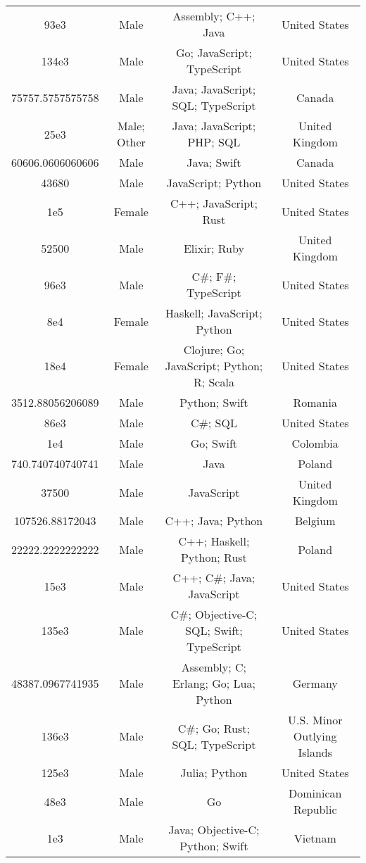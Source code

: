 \begin{center}
\begin{tabular}{ |c|c|c|c| }
93e3  &  Male  &  Assembly; C++; Java  &  United States  \\ 
134e3  &  Male  &  Go; JavaScript; TypeScript  &  United States  \\ 
75757.5757575758  &  Male  &  Java; JavaScript; SQL; TypeScript  &  Canada  \\ 
25e3  &  Male; Other  &  Java; JavaScript; PHP; SQL  &  United Kingdom  \\ 
60606.0606060606  &  Male  &  Java; Swift  &  Canada  \\ 
43680  &  Male  &  JavaScript; Python  &  United States  \\ 
1e5  &  Female  &  C++; JavaScript; Rust  &  United States  \\ 
52500  &  Male  &  Elixir; Ruby  &  United Kingdom  \\ 
96e3  &  Male  &  C\#; F\#; TypeScript  &  United States  \\ 
8e4  &  Female  &  Haskell; JavaScript; Python  &  United States  \\ 
18e4  &  Female  &  Clojure; Go; JavaScript; Python; R; Scala  &  United States  \\ 
3512.88056206089  &  Male  &  Python; Swift  &  Romania  \\ 
86e3  &  Male  &  C\#; SQL  &  United States  \\ 
1e4  &  Male  &  Go; Swift  &  Colombia  \\ 
740.740740740741  &  Male  &  Java  &  Poland  \\ 
37500  &  Male  &  JavaScript  &  United Kingdom  \\ 
107526.88172043  &  Male  &  C++; Java; Python  &  Belgium  \\ 
22222.2222222222  &  Male  &  C++; Haskell; Python; Rust  &  Poland  \\ 
15e3  &  Male  &  C++; C\#; Java; JavaScript  &  United States  \\ 
135e3  &  Male  &  C\#; Objective-C; SQL; Swift; TypeScript  &  United States  \\ 
48387.0967741935  &  Male  &  Assembly; C; Erlang; Go; Lua; Python  &  Germany  \\ 
136e3  &  Male  &  C\#; Go; Rust; SQL; TypeScript  &  U.S. Minor Outlying Islands  \\ 
125e3  &  Male  &  Julia; Python  &  United States  \\ 
48e3  &  Male  &  Go  &  Dominican Republic  \\ 
1e3  &  Male  &  Java; Objective-C; Python; Swift  &  Vietnam  \\ 

\end{tabular}
\end{center}
